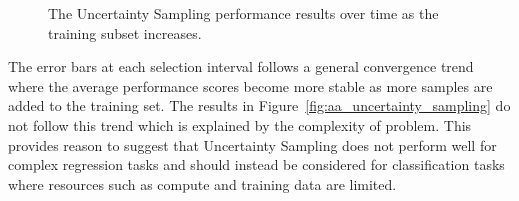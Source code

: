 \documentclass[conference]{IEEEtran}
\begin{document}
\begin{figure}[htbp]
		\hfil
		\caption{The Uncertainty Sampling performance results over time as the training subset increases.}
		\label{fig:uncertainty_sampling_all}
	\end{figure}
	
	The error bars at each selection interval follows a general convergence trend where the average performance scores become more stable as more samples are added to the training set. The results in Figure~\ref{fig:aa_uncertainty_sampling} do not follow this trend which is explained by the complexity of problem. This provides reason to suggest that Uncertainty Sampling does not perform well for complex regression tasks and should instead be considered for classification tasks where resources such as compute and training data are limited.
	
\end{document}
